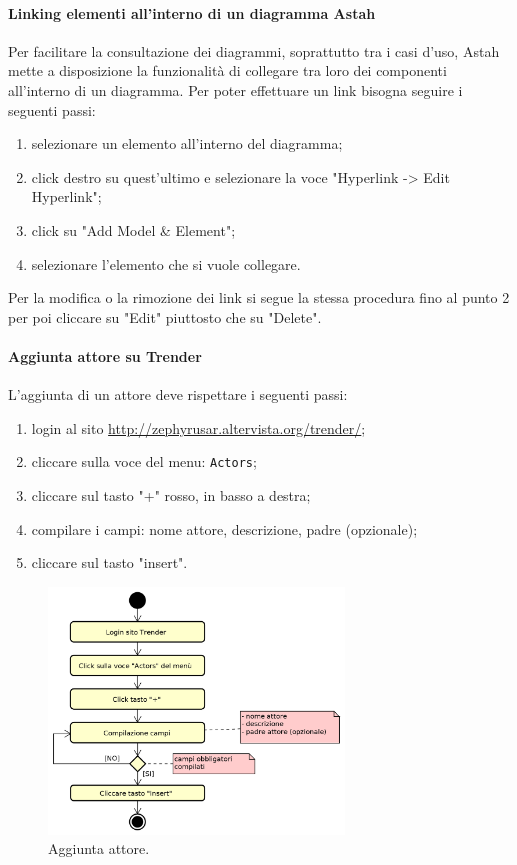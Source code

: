 	    \paragraph{Linking elementi all'interno di un diagramma Astah}
	    Per facilitare la consultazione dei diagrammi, soprattutto tra i casi d'uso, Astah mette a disposizione la funzionalità di collegare tra loro dei componenti all'interno di un diagramma. Per poter effettuare un link bisogna seguire i seguenti passi:
	    \begin{enumerate}
	    	\item selezionare un elemento all'interno del diagramma;
	    	\item click destro su quest'ultimo e selezionare la voce "Hyperlink -> Edit Hyperlink";
	    	\item click su "Add Model \& Element";
	    	\item selezionare l'elemento che si vuole collegare.
	    \end{enumerate}
	    Per la modifica o la rimozione dei link si segue la stessa procedura fino al punto 2 per poi cliccare su "Edit" piuttosto che su "Delete".
	    \paragraph{Aggiunta attore su Trender}
	    L'aggiunta di un attore deve rispettare i seguenti passi:
	    \begin{enumerate}
	    	\item login al sito \url{http://zephyrusar.altervista.org/trender/};
		    \item cliccare sulla voce del menu: \texttt{Actors};
			\item cliccare sul tasto "+" rosso, in basso a destra;
			\item compilare i campi: nome attore, descrizione, padre (opzionale);
	    	\item cliccare sul tasto "insert".
	    \end{enumerate}
	    \begin{figure}[H]
	    	\centering
	    	\includegraphics[width=0.7\textwidth]{img/AggiuntaAttore}
	    	\caption{Aggiunta attore.}
	    \end{figure}
